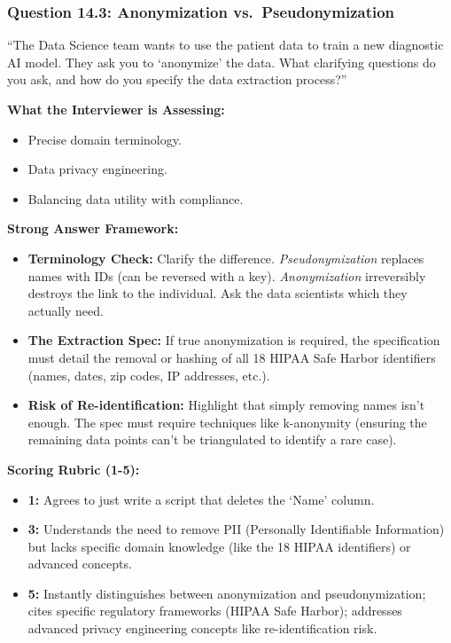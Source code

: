 \subsubsection{Question 14.3: Anonymization
vs.~Pseudonymization}\label{question-14.3-anonymization-vs.-pseudonymization}

``The Data Science team wants to use the patient data to train a new
diagnostic AI model. They ask you to `anonymize' the data. What
clarifying questions do you ask, and how do you specify the data
extraction process?''

\textbf{What the Interviewer is Assessing:}

\begin{itemize}
\tightlist
\item
  Precise domain terminology.
\item
  Data privacy engineering.
\item
  Balancing data utility with compliance.
\end{itemize}

\textbf{Strong Answer Framework:}

\begin{itemize}
\tightlist
\item
  \textbf{Terminology Check:} Clarify the difference.
  \emph{Pseudonymization} replaces names with IDs (can be reversed with
  a key). \emph{Anonymization} irreversibly destroys the link to the
  individual. Ask the data scientists which they actually need.
\item
  \textbf{The Extraction Spec:} If true anonymization is required, the
  specification must detail the removal or hashing of all 18 HIPAA Safe
  Harbor identifiers (names, dates, zip codes, IP addresses, etc.).
\item
  \textbf{Risk of Re-identification:} Highlight that simply removing
  names isn't enough. The spec must require techniques like k-anonymity
  (ensuring the remaining data points can't be triangulated to identify
  a rare case).
\end{itemize}

\textbf{Scoring Rubric (1-5):}

\begin{itemize}
\tightlist
\item
  \textbf{1:} Agrees to just write a script that deletes the `Name'
  column.
\item
  \textbf{3:} Understands the need to remove PII (Personally
  Identifiable Information) but lacks specific domain knowledge (like
  the 18 HIPAA identifiers) or advanced concepts.
\item
  \textbf{5:} Instantly distinguishes between anonymization and
  pseudonymization; cites specific regulatory frameworks (HIPAA Safe
  Harbor); addresses advanced privacy engineering concepts like
  re-identification risk.
\end{itemize}

